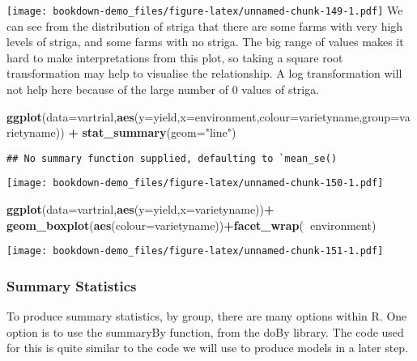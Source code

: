 \documentclass[]{book}
\newenvironment{Shaded}{\begin{snugshade}}{\end{snugshade}}
\newcommand{\KeywordTok}[1]{\textcolor[rgb]{0.13,0.29,0.53}{\textbf{#1}}}
\newcommand{\DataTypeTok}[1]{\textcolor[rgb]{0.13,0.29,0.53}{#1}}
\newcommand{\StringTok}[1]{\textcolor[rgb]{0.31,0.60,0.02}{#1}}
\newcommand{\OperatorTok}[1]{\textcolor[rgb]{0.81,0.36,0.00}{\textbf{#1}}}
\newcommand{\NormalTok}[1]{#1}
\theoremstyle{definition}
\theoremstyle{definition}
\theoremstyle{definition}
\theoremstyle{remark}
\begin{document}
\texttt{[image: bookdown-demo\_files/figure-latex/unnamed-chunk-149-1.pdf]}
We can see from the distribution of striga that there are some farms
with very high levels of striga, and some farms with no striga. The big
range of values makes it hard to make interpretations from this plot, so
taking a square root transformation may help to visualise the
relationship. A log transformation will not help here because of the
large number of 0 values of striga.

\begin{Shaded}
\begin{Highlighting}[]
\KeywordTok{ggplot}\NormalTok{(}\DataTypeTok{data=}\NormalTok{vartrial,}\KeywordTok{aes}\NormalTok{(}\DataTypeTok{y=}\NormalTok{yield,}\DataTypeTok{x=}\NormalTok{environment,}\DataTypeTok{colour=}\NormalTok{varietyname,}\DataTypeTok{group=}\NormalTok{varietyname)) }\OperatorTok{+}
\StringTok{  }\KeywordTok{stat_summary}\NormalTok{(}\DataTypeTok{geom=}\StringTok{"line"}\NormalTok{)}
\end{Highlighting}
\end{Shaded}

\begin{verbatim}
## No summary function supplied, defaulting to `mean_se()
\end{verbatim}

\texttt{[image: bookdown-demo\_files/figure-latex/unnamed-chunk-150-1.pdf]}

\begin{Shaded}
\begin{Highlighting}[]
\KeywordTok{ggplot}\NormalTok{(}\DataTypeTok{data=}\NormalTok{vartrial,}\KeywordTok{aes}\NormalTok{(}\DataTypeTok{y=}\NormalTok{yield,}\DataTypeTok{x=}\NormalTok{varietyname))}\OperatorTok{+}
\StringTok{  }\KeywordTok{geom_boxplot}\NormalTok{(}\KeywordTok{aes}\NormalTok{(}\DataTypeTok{colour=}\NormalTok{varietyname))}\OperatorTok{+}\KeywordTok{facet_wrap}\NormalTok{(}\OperatorTok{~}\NormalTok{environment)}
\end{Highlighting}
\end{Shaded}

\texttt{[image: bookdown-demo\_files/figure-latex/unnamed-chunk-151-1.pdf]}

\subsubsection{Summary Statistics}\label{summary-statistics-3}

To produce summary statistics, by group, there are many options within
R. One option is to use the summaryBy function, from the doBy library.
The code used for this is quite similar to the code we will use to
produce models in a later step.
\end{document}
